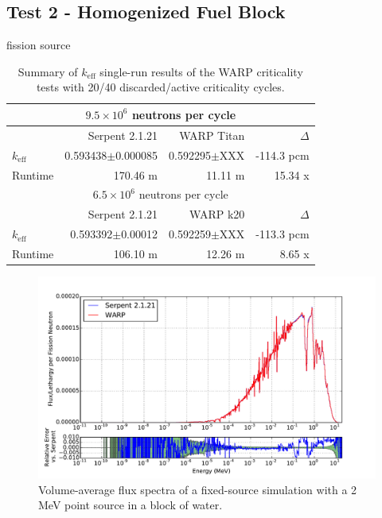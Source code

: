 \documentclass[preprint,12pt]{elsarticle}
\begin{document}
\subsection{Test 2 - Homogenized Fuel Block}

fission source

\begin{table}[h]
\centering
\caption{Summary of $k_\mathrm{eff}$ single-run results of the WARP criticality tests with 20/40 discarded/active criticality cycles.}
\label{homfuel_table}
\small
\begin{tabular}{| l | r | r | r |}
\hline
\multicolumn{4}{|c|}{$9.5\times10^6$ neutrons per cycle} \\
\hline
                  & Serpent 2.1.21         & WARP Titan               & $\Delta$ \\
\hline
$k_\mathrm{eff}$  & 0.593438$\pm$0.000085  & 0.592295$\pm$XXX         & -114.3 pcm \\
\hline
Runtime           & 170.46 m               & 11.11 m                  & 15.34 x \\
\hline
\hline
\multicolumn{4}{|c|}{$6.5\times10^6$ neutrons per cycle} \\
\hline
                  & Serpent 2.1.21       & WARP k20            & $\Delta$ \\
\hline
$k_\mathrm{eff}$  & 0.593392$\pm$0.00012 & 0.592259$\pm$XXX    & -113.3 pcm \\
\hline
Runtime           & 106.10 m             & 12.26 m             & 8.65 x\\
\hline
\end{tabular}
\end{table}


\begin{figure}[h!]
\centering
\includegraphics[width=\textwidth,trim= 1cm 0cm 1cm 0cm]{graphics/homfuel_spec.pdf}
\caption{Volume-average flux spectra of a fixed-source simulation with a 2 MeV point source in a block of water. \label{homfuel_spec} }
\end{figure}
\end{document}
